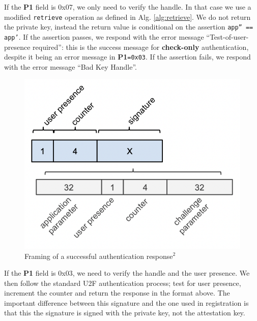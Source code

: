 \documentclass[acmtog,review]{acmart}
\begin{document}
If the \textbf{P1} field is 0x07, we only need to verify the handle. In that case we use a modified \texttt{retrieve} operation as defined in Alg. \ref{alg:retrieve}. 
We do not return the private key, instead the return value is conditional on the assertion \texttt{app'' == app'}.
If the assertion passes, we respond with the error message ``Test-of-user-presence required'': this is the success message for \textbf{check-only} authentication, despite it being an error message in \textbf{P1}\texttt{=0x03}.
If the assertion fails, we respond with the error message ``Bad Key Handle''.
\begin{figure}[H]
    \centering
    \includegraphics[scale=0.43]{authresp.png}
    \caption{Framing of a successful authentication response$^2$}
\end{figure}

If the \textbf{P1} field is 0x03, we need to verify the handle and the user presence. We then follow the standard U2F authentication process; test for user presence, increment the counter and return the response in the format above. The important difference between this signature and the one used in registration is that this the signature is signed with the private key, not the attestation key.



\end{document}
